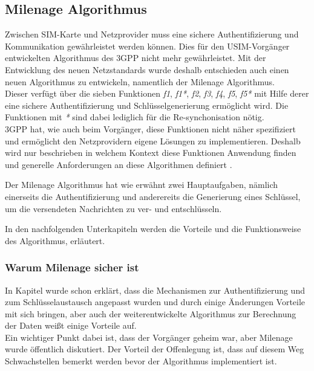 \subsection{Milenage Algorithmus}
\label{milenage}
Zwischen \ac{SIM}-Karte und Netzprovider muss eine sichere Authentifizierung und
Kommunikation gewährleistet werden können. Dies für den USIM-Vorgänger entwickelten Algorithmus des \ac{3GPP} nicht mehr
gewährleistet. Mit der Entwicklung des neuen Netzstandards wurde deshalb entschieden
auch einen neuen Algorithmus zu entwickeln, namentlich der Milenage Algorithmus. \\
Dieser verfügt über die sieben Funktionen \emph{f1}, \emph{f1*}, \emph{f2}, \emph{f3},
\emph{f4}, \emph{f5}, \emph{f5*} mit Hilfe derer eine sichere Authentifizierung und
Schlüsselgenerierung ermöglicht wird. Die Funktionen mit \emph{*} sind dabei lediglich für die
Re-synchonisation nötig. \\
3GPP hat, wie auch beim Vorgänger, diese Funktionen nicht näher spezifiziert und ermöglicht
den Netzprovidern eigene Lösungen zu implementieren. Deshalb wird nur beschrieben in
welchem Kontext diese Funktionen Anwendung finden und generelle Anforderungen
an diese Algorithmen definiert \cite{3gpp.35.205}.

Der Milenage Algorithmus hat wie erwähnt zwei Hauptaufgaben, nämlich einerseits die
Authentifizierung und anderereits die Generierung eines Schlüssel, um die versendeten Nachrichten zu
ver- und entschlüsseln.

In den nachfolgenden Unterkapiteln werden die Vorteile und die Funktionsweise des
Algorithmus, erläutert.

 \subsubsection{Warum Milenage sicher ist}
 In Kapitel  wurde schon erklärt, dass die Mechanismen
 zur Authentifizierung und zum Schlüsselaustausch angepasst wurden und durch einige
 Änderungen Vorteile mit sich bringen, aber auch der weiterentwickelte Algorithmus zur
 Berechnung der Daten weißt einige Vorteile auf. \\
 Ein wichtiger Punkt dabei ist, dass der Vorgänger geheim war, aber Milenage wurde öffentlich
 diskutiert. Der Vorteil der Offenlegung ist, dass auf diesem Weg Schwachstellen bemerkt werden
 bevor der Algorithmus implementiert ist. 
 
